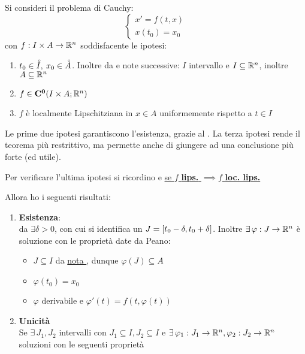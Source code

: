 \begin{theorem}
	\label{teo:cau_locale_part_1}
	Si consideri il problema di Cauchy:
	\[\begin{cases}x'=f(t,x)\\x(t_0)=x_0\end{cases}\]
	con $f:I\times A \to \mathbb{R}^n$ soddisfacente le ipotesi:
	\begin{enumerate}
		\item $t_0\in \accentset{\circ}{I},\:x_0\in \accentset{\circ}{A}$. Inoltre da  e note successive: $I$ intervallo e $I\subseteq \mathbb{R}^n$, inoltre $A\subseteq \mathbb{R}^n$
		\item $f\in \mathbf{C^{0}}(I\times A; \mathbb{R}^n)$ 
		\item $f$ è localmente Lipschitziana in $x\in A$ uniformemente rispetto a $t\in I$
	\end{enumerate}
	\begin{note}
		Le prime due ipotesi garantiscono l'esistenza, grazie al . La terza ipotesi rende il teorema più restrittivo, ma permette anche di giungere ad una conclusione più forte (ed utile).
	\end{note}
		\begin{note}
		Per verificare l'ultima ipotesi si ricordino  e \hyperlink{note:if_lips_then_loclips}{se $f$ \textbf{lips.} $\implies f$ \textbf{loc. lips.}}
	\end{note}
	Allora ho i seguenti risultati:
	\begin{enumerate}
		\item \textbf{Esistenza}:\\
		da  $\exists \delta>0$, con cui si identifica un $J=\left[t_0-\delta,t_0+\delta\right]$. Inoltre $\exists\,\varphi : J \to \mathbb{R}^n$ è soluzione con le proprietà date da Peano:
		\begin{itemize}
			\item $J\subseteq I$ da \hyperlink{note:diff_eq_sol_definit_set}{nota }, dunque $\varphi(J)\subseteq A$
			\item $\varphi(t_0)=x_0$
			\item $\varphi$ derivabile e $\varphi'(t)=f(t,\varphi(t))$
		\end{itemize}
		\item \textbf{Unicità}\\
		Se $\exists\,J_1,J_2$ intervalli con $J_1\subseteq I,J_2\subseteq I$ e $\exists\,\varphi_1:J_1\to \mathbb{R}^n, \varphi_2:J_2\to \mathbb{R}^n$ soluzioni con le seguenti proprietà

\end{enumerate}
\end{theorem}
